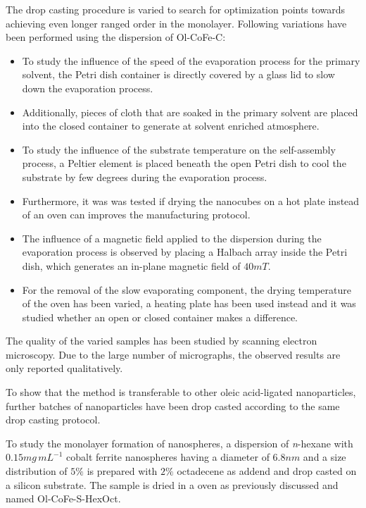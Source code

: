 \documentclass[\main/dresen_thesis.tex]{subfiles}
\begin{document}
      The drop casting procedure is varied to search for optimization points towards achieving even longer ranged order in the monolayer.
      Following variations have been performed using the dispersion of Ol-CoFe-C:
      \begin{itemize}
        \item To study the influence of the speed of the evaporation process for the primary solvent, the Petri dish container is directly covered by a glass lid to slow down the evaporation process. %

        \item Additionally, pieces of cloth that are soaked in the primary solvent are placed into the closed container to generate at solvent enriched atmosphere. %

        \item To study the influence of the substrate temperature on the self-assembly process, a Peltier element is placed beneath the open Petri dish to cool the substrate by few degrees during the evaporation process. %

        \item Furthermore, it was was tested if drying the nanocubes on a hot plate instead of an oven can improves the manufacturing protocol.

        \item The influence of a magnetic field applied to the dispersion during the evaporation process is observed by placing a Halbach array inside the Petri dish, which generates an in-plane magnetic field of $40 \unit{mT}$.

        \item For the removal of the slow evaporating component, the drying temperature of the oven has been varied, a heating plate has been used instead and it was studied whether an open or closed container makes a difference.
      \end{itemize}
      The quality of the varied samples has been studied by scanning electron microscopy.
      Due to the large number of micrographs, the observed results are only reported qualitatively.

      To show that the method is transferable to other oleic acid-ligated nanoparticles, further batches of nanoparticles have been drop casted according to the same drop casting protocol.

      To study the monolayer formation of nanospheres, a dispersion of \textit{n}-hexane with $0.15 \unit{mg \, mL^{-1}}$ cobalt ferrite nanospheres having a diameter of $6.8 \unit{nm}$ and a size distribution of $5 \unit{\%}$ is prepared with $2 \unit{\%}$ octadecene as addend and drop casted on a silicon substrate.
      The sample is dried in a oven as previously discussed and named Ol-CoFe-S-HexOct.
\end{document}
